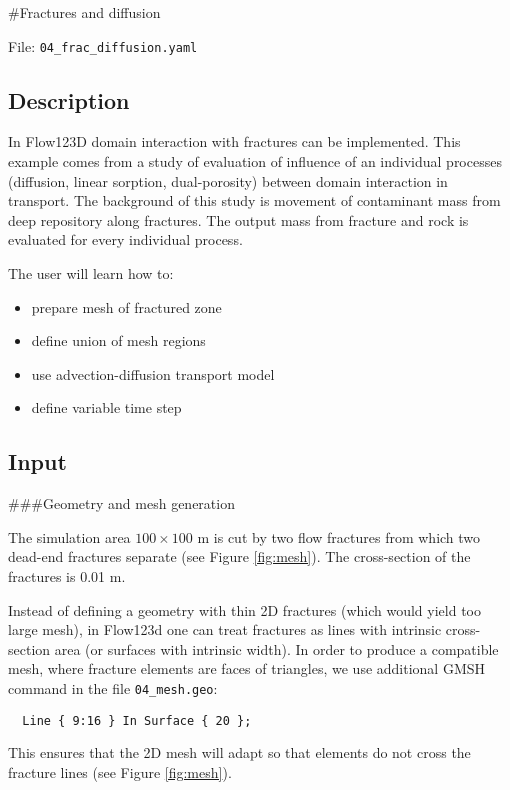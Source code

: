 \#Fractures and diffusion

File: \texttt{04\_frac\_diffusion.yaml}

\subsection{Description}

In Flow123D domain interaction with fractures can be implemented. This
example comes from a study of evaluation of influence of an individual
processes (diffusion, linear sorption, dual-porosity) between domain
interaction in transport. The background of this study is movement of
contaminant mass from deep repository along fractures. The output mass
from fracture and rock is evaluated for every individual process.

The user will learn how to:

\begin{itemize}
\tightlist
\item
  prepare mesh of fractured zone
\item
  define union of mesh regions
\item
  use advection-diffusion transport model
\item
  define variable time step
\end{itemize}

\subsection{Input}

\#\#\#Geometry and mesh generation

The simulation area \(100 \times 100\) m is cut by two flow fractures
from which two dead-end fractures separate (see Figure \ref{fig:mesh}).
The cross-section of the fractures is 0.01 m.

Instead of defining a geometry with thin 2D fractures (which would yield
too large mesh), in Flow123d one can treat fractures as lines with
intrinsic cross-section area (or surfaces with intrinsic width). In
order to produce a compatible mesh, where fracture elements are faces of
triangles, we use additional GMSH command in the file
\texttt{04\_mesh.geo}:

\begin{verbatim}
  Line { 9:16 } In Surface { 20 };
\end{verbatim}

This ensures that the 2D mesh will adapt so that elements do not cross
the fracture lines (see Figure \ref{fig:mesh}).

